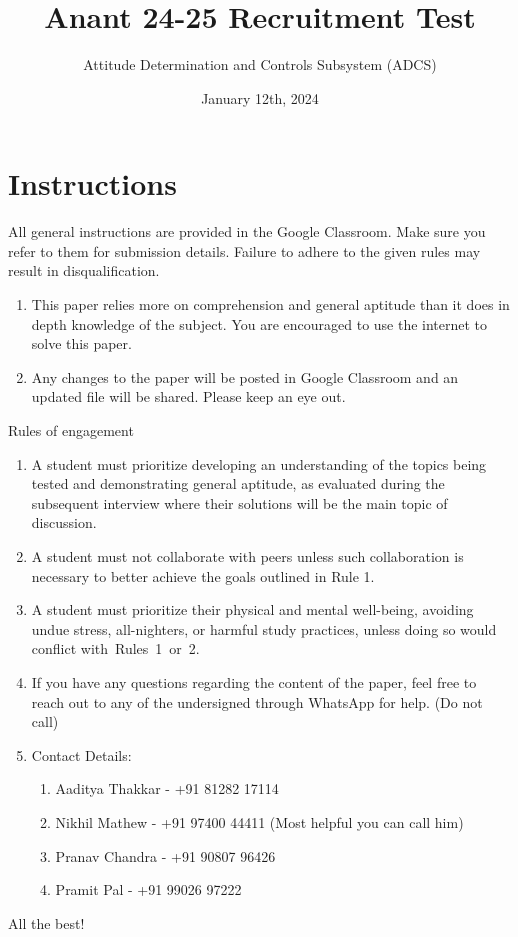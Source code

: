 \documentclass[a4paper, 12pt]{exam}
\begin{document}
	\title{Anant 24-25 Recruitment Test}
	\author{Attitude Determination and Controls Subsystem (ADCS)}
	\date{January 12th, 2024}
	\maketitle
	
	\section*{Instructions}
	All general instructions are provided in the Google Classroom. Make sure you refer to them for submission details. Failure to adhere to the given rules may result in disqualification. 
	\begin{enumerate}[]
		\item This paper relies more on comprehension and general aptitude than it does in depth knowledge of the subject. You are encouraged to use the internet to solve this paper.
		\item Any changes to the paper will be posted in Google Classroom and an updated file will be shared. Please keep an eye out.
	\end{enumerate}
	Rules of engagement
	\begin{enumerate}[label = \textbf{Rule \arabic* }:, leftmargin=5em]
		\item A student must prioritize developing an understanding of the topics being tested and demonstrating general aptitude, as evaluated during the subsequent interview where their solutions will be the main topic of discussion.
		
		\item A student must not collaborate with peers unless such collaboration is necessary to better achieve the goals outlined in Rule 1.
		
		\item A student must prioritize their physical and mental well-being, avoiding undue stress, all-nighters, or harmful study practices, unless doing so would conflict with Rules 1 or 2.
		\item If you have any questions regarding the content of the paper, feel free to reach out to any of the undersigned through WhatsApp for help. (Do not call)
		\item Contact Details:
		\begin{enumerate}
			\item Aaditya Thakkar - +91 81282 17114
			\item Nikhil Mathew - +91 97400 44411 (Most helpful you can call him)
			\item Pranav Chandra - +91 90807 96426
			\item Pramit Pal - +91 99026 97222
		\end{enumerate}
	\end{enumerate}
	\begin{center}
		All the best!
	\end{center}
		
\end{document}
